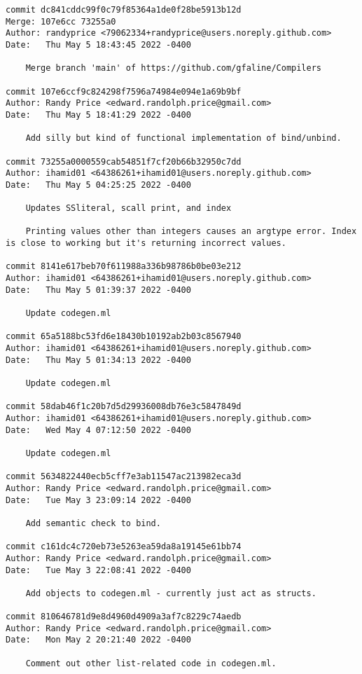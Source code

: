{\begin{verbatim}
commit dc841cddc99f0c79f85364a1de0f28be5913b12d
Merge: 107e6cc 73255a0
Author: randyprice <79062334+randyprice@users.noreply.github.com>
Date:   Thu May 5 18:43:45 2022 -0400

    Merge branch 'main' of https://github.com/gfaline/Compilers

commit 107e6ccf9c824298f7596a74984e094e1a69b9bf
Author: Randy Price <edward.randolph.price@gmail.com>
Date:   Thu May 5 18:41:29 2022 -0400

    Add silly but kind of functional implementation of bind/unbind.

commit 73255a0000559cab54851f7cf20b66b32950c7dd
Author: ihamid01 <64386261+ihamid01@users.noreply.github.com>
Date:   Thu May 5 04:25:25 2022 -0400

    Updates SSliteral, scall print, and index
    
    Printing values other than integers causes an argtype error. Index is close to working but it's returning incorrect values.

commit 8141e617beb70f611988a336b98786b0be03e212
Author: ihamid01 <64386261+ihamid01@users.noreply.github.com>
Date:   Thu May 5 01:39:37 2022 -0400

    Update codegen.ml

commit 65a5188bc53fd6e18430b10192ab2b03c8567940
Author: ihamid01 <64386261+ihamid01@users.noreply.github.com>
Date:   Thu May 5 01:34:13 2022 -0400

    Update codegen.ml

commit 58dab46f1c20b7d5d29936008db76e3c5847849d
Author: ihamid01 <64386261+ihamid01@users.noreply.github.com>
Date:   Wed May 4 07:12:50 2022 -0400

    Update codegen.ml

commit 5634822440ecb5cff7e3ab11547ac213982eca3d
Author: Randy Price <edward.randolph.price@gmail.com>
Date:   Tue May 3 23:09:14 2022 -0400

    Add semantic check to bind.

commit c161dc4c720eb73e5263ea59da8a19145e61bb74
Author: Randy Price <edward.randolph.price@gmail.com>
Date:   Tue May 3 22:08:41 2022 -0400

    Add objects to codegen.ml - currently just act as structs.

commit 810646781d9e8d4960d4909a3af7c8229c74aedb
Author: Randy Price <edward.randolph.price@gmail.com>
Date:   Mon May 2 20:21:40 2022 -0400

    Comment out other list-related code in codegen.ml.


\end{verbatim}}
